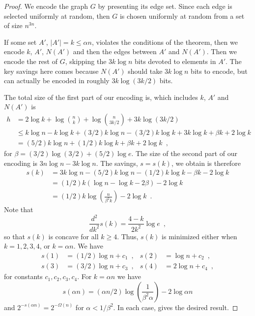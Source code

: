 \documentclass{patmorin}
\begin{document}
\begin{proof}
  We encode the graph $G$ by presenting its edge set. Since each edge
  is selected uniformly at random, then $G$ is chosen uniformly at
  random from a set of size $n^{3n}$.

  If some set $A'$, $|A'|=k\le \alpha n$, violates the conditions of
  the theorem, then we encode $k$, $A'$, $N(A')$ and then the edges
  between $A'$ and $N(A')$. Then we encode the rest of $G$, skipping
  the $3k\log n$ bits devoted to elements in $A'$.  The key savings
  here comes because $N(A')$ should take $3k\log n$ bits to encode,
  but can actually be encoded in roughly $3k\log(3k/2)$ bits.

  The total size of the first part of our encoding is, which includes
  $k$, $A'$ and $N(A')$ is
  \begin{align*}
    h & = 2\log k + \log\binom{n}{k} + \log\binom{n}{3k/2} + 3k\log (3k/2) \\
      & \le k\log n - k\log k + (3/2)k\log n - (3/2)k\log k + 3k\log k + \beta k + 2 \log k \\
      & = (5/2)k\log n + (1/2)k\log k + \beta k + 2 \log k  \enspace ,
  \end{align*}
  for $\beta = (3/2) \log (3/2) + (5/2) \log e$. The size of the
  second part of our encoding is $3n\log n - 3k\log n$.  The savings,
  $s=s(k)$, we obtain is therefore
  \begin{align*}
    s(k) & = 3k\log n - (5/2)k\log n - (1/2)k\log k - \beta k - 2 \log k \\
         & = (1/2)k(\log n - \log k - 2 \beta) - 2\log k \\
         & = (1/2)k\log\left(\frac{n}{\beta^2 k}\right) - 2 \log k \enspace .
  \end{align*}
  Note that
  \[
  \frac{d^2}{dk^2} s(k) = \frac{4 - k}{2 k^2} \log e \enspace ,
  \]
  so that $s(k)$ is concave for all $k \geq 4$. Thus, $s(k)$ is
  minimized either when $k = 1, 2, 3, 4$, or $k = \alpha n$. We have
  \begin{align*}
    s(1) &= (1/2)\log n + c_1 \enspace , & 
    s(2) &= \log n + c_2 \enspace , \\
    s(3) &= (3/2) \log n + c_3 \enspace , &
    s(4) &= 2 \log n + c_4 \enspace ,
  \end{align*}
  for constants $c_1, c_2, c_3, c_4$. For $k=\alpha n$ we have
  \[
  s(\alpha n) = (\alpha n/2)\log \left(\frac{1}{\beta^2 \alpha}\right)
  - 2 \log \alpha n
  \]
  and $2^{-s(\alpha n)} = 2^{-\Omega(n)}$ for $\alpha < 1/\beta^2$. In
  each case,  gives the desired result.
\end{proof}
\end{document}
